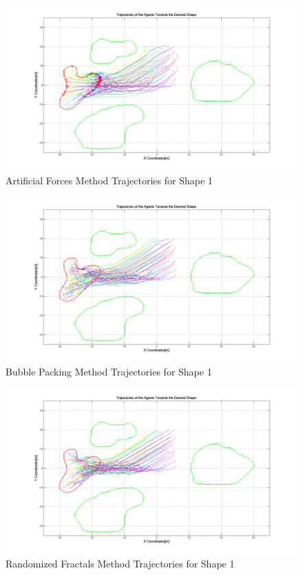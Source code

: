 			\begin{figure}[H]
				\caption{Artificial Forces Method Trajectories for Shape 1}
				\centerline{\includegraphics[scale = 0.35]{Aritificial_Trajecories_1}}
			\end{figure} 	

		\begin{figure}[H]
			\caption{Bubble Packing Method Trajectories for Shape 1}
			\centerline{\includegraphics[scale = 0.35]{Bubble_Trajectories_1}}
		\end{figure} 	
		
			\begin{figure}[H]
				\caption{Randomized Fractals Method Trajectories for Shape 1}
				\centerline{\includegraphics[scale = 0.35]{Randomized_Trajectories_1}}
			\end{figure} 	
			
